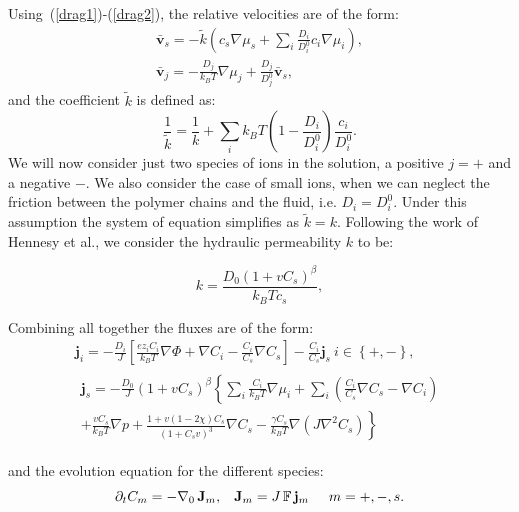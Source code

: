\documentclass[12pt]{extarticle}
\newcommand{\F}{\ensuremath{\mathbb{F}}}
\begin{document}
Using~(\ref{drag1})-(\ref{drag2}), the relative velocities are of the form:
\begin{eqnarray}
\bar{\mathbf{v}}_s = -\tilde{k} \left(c_s\nabla \mu_s +\sum_i \frac{D_i}{D^0_i} c_i \nabla \mu_i\right),\\
\bar{\mathbf{v}}_j = - \frac{D_j}{k_B T}\nabla \mu_j + \frac{D_j}{D^0_j} \bar{\mathbf{v}}_s, 
\end{eqnarray}
and the coefficient $\tilde{k}$ is defined as:
\begin{equation}
\frac{1}{\tilde{k}} = \frac{1}{k} + \sum_i k_B T \left(1-\frac{D_i}{D^0_i}\right) \frac{c_i}{D^0_i}.
\end{equation}
We will now consider just two species of ions in the solution, a positive $j=+$ and a negative $-$. We also consider the case of small ions, when we can neglect the friction between the polymer chains and the fluid, i.e. $D_{i}=D^0_i$. Under this assumption the system of equation simplifies as $\tilde{k}=k$. Following the work of Hennesy et al., we consider the hydraulic permeability $k$ to be:

\begin{equation}
k = \frac{D_0(1+vC_s)^\beta}{k_B T c_s},
\end{equation}

Combining all together the fluxes are of the form:
\begin{eqnarray}
\mathbf{j}_{i}  = - \frac{D_{i}}{J}\left[ \frac{ez_{i}C_i}{k_BT} \nabla \Phi + \nabla C_{i} - \frac{C_i}{C_s} \nabla C_s \right]  - \frac{C_{i}}{C_s} \mathbf{j}_s \ i\in \left\{+,-\right\},\\[2mm]
\begin{aligned}
\mathbf{j}_s = - \frac{D_0}{J}(1+vC_s)^\beta \left\{\sum_{i} \frac{C_i}{k_B T} \nabla \mu_i + \sum_i \left(\frac{C_i}{C_s} \nabla C_s - \nabla C_i\right)\right.\\
\left.  + \frac{vC_s}{k_B T} \nabla p + \frac{1+v(1-2\chi)C_s}{(1+C_sv)^3} \nabla C_s-\frac{\gamma C_s}{k_B T} \nabla (J \nabla^2 C_s) \right\} 
\end{aligned}
\end{eqnarray}

and the evolution equation for the different species:
\begin{equation}
\partial_t C_m = -\nabla_0\, \mathbf{J}_m, \hspace{3mm} \mathbf{J}_m = J\, \F\, \mathbf{j}_m \hspace{5mm} m=+,-,s.\\
\end{equation}
\end{document}
